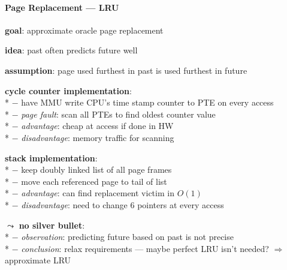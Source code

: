 \paragraph{Page Replacement --- LRU}
\begin{items}
  \item \textbf{goal}: approximate oracle page replacement
  \item \textbf{idea}: past often predicts future well
  \item \textbf{assumption}: page used furthest in past is used furthest in future
  \item \textbf{cycle counter implementation}: \\*
    $ - $ have MMU write CPU's time stamp counter to PTE on every access \\*
    $ - $ \emph{page fault}: scan all PTEs to find oldest counter value \\*
    $ - $ \emph{advantage}: cheap at access if done in HW \\*
    $ - $ \emph{disadvantage}: memory traffic for scanning
  \item \textbf{stack implementation}: \\*
    $ - $ keep doubly linked list of all page frames \\*
    $ - $ move each referenced page to tail of list \\*
    $ - $ \emph{advantage}: can find replacement victim in $ O(1) $ \\*
    $ - $ \emph{disadvantage}: need to change 6 pointers at every access
  \item $ \leadsto $ \textbf{no silver bullet}: \\*
    $ - $ \emph{observation}: predicting future based on past is not precise \\*
    $ - $ \emph{conclusion}: relax requirements --- maybe perfect LRU isn't needed? $ \Rightarrow $ approximate LRU
\end{items}

